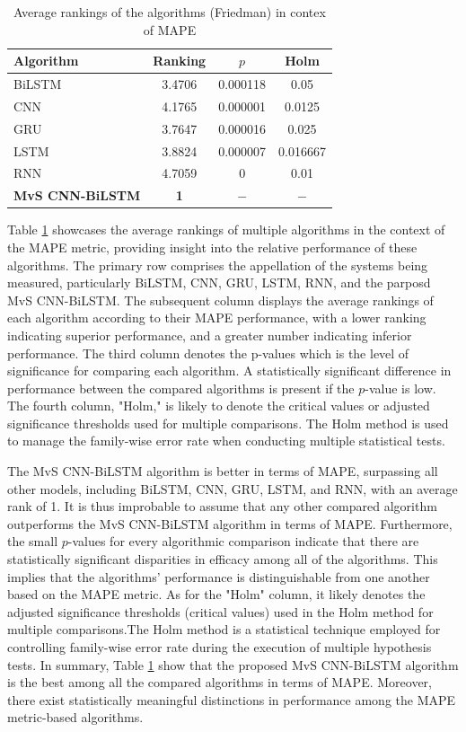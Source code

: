 \documentclass[a4paper,fleqn]{cas-dc}
\begin{document}
    \begin{table}[!htp]
      \caption{Average rankings of the algorithms (Friedman) in contex of MAPE}
      \centering
      \begin{tabular}{lccc}\hline
      Algorithm&Ranking&$p$&Holm\\\hline
      BiLSTM&3.4706&0.000118&0.05\\
      CNN&4.1765&0.000001&0.0125\\
      GRU&3.7647&0.000016&0.025\\
      LSTM&3.8824&0.000007&0.016667\\
      RNN&4.7059&0&0.01\\
      \textbf{MvS CNN-BiLSTM}&\textbf{1}&$-$ &$-$\\\hline
    \end{tabular}
      
      \label{rank_mape}
      \end{table}
      Table \ref{rank_mape} showcases the average rankings of multiple algorithms in the context of the MAPE metric, providing insight into the relative performance of these algorithms. The primary row comprises the appellation of the systems being measured, particularly BiLSTM, CNN, GRU, LSTM, RNN, and the parposd MvS CNN-BiLSTM. The subsequent column displays the average rankings of each algorithm according to their MAPE performance, with a lower ranking indicating superior performance, and a greater number indicating inferior performance. The third column denotes the p-values which is the level of significance for comparing each algorithm. A statistically significant difference in performance between the compared algorithms is present if the $p$-value is low. The fourth column, "Holm," is likely to denote the critical values or adjusted significance thresholds used for multiple comparisons. The Holm method is used to manage the family-wise error rate when conducting multiple statistical tests.
      
      The MvS CNN-BiLSTM algorithm is better in terms of MAPE, surpassing all other models, including BiLSTM, CNN, GRU, LSTM, and RNN, with an average rank of 1. It is thus improbable to assume that any other compared algorithm outperforms the MvS CNN-BiLSTM algorithm in terms of MAPE. Furthermore, the small $p$-values for every algorithmic comparison indicate that there are statistically significant disparities in efficacy among all of the algorithms. This implies that the algorithms' performance is distinguishable from one another based on the MAPE metric. As for the "Holm" column, it likely denotes the adjusted significance thresholds (critical values) used in the Holm method for multiple comparisons.The Holm method is a statistical technique employed for controlling family-wise error rate during the execution of multiple hypothesis tests. In summary, Table \ref{rank_mape} show that the proposed MvS CNN-BiLSTM algorithm is the best among all the compared algorithms in terms of MAPE. Moreover, there exist statistically meaningful distinctions in performance among the MAPE metric-based algorithms.
    
\end{document}

